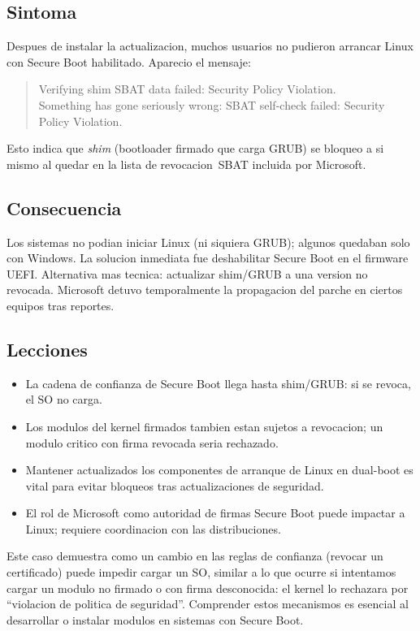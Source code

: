 \subsection*{Sintoma}

Despues de instalar la actualizacion, muchos usuarios no pudieron arrancar Linux con Secure Boot habilitado. Aparecio el mensaje:

\begin{quote}\small
Verifying shim SBAT data failed: Security Policy Violation.\\
Something has gone seriously wrong: SBAT self-check failed: Security Policy Violation.
\end{quote}

Esto indica que \emph{shim} (bootloader firmado que carga GRUB) se bloqueo a si mismo al quedar en la lista de revocacion~SBAT incluida por Microsoft.

\subsection*{Consecuencia}

Los sistemas no podian iniciar Linux (ni siquiera GRUB); algunos quedaban solo con Windows. La solucion inmediata fue deshabilitar Secure Boot en el firmware UEFI. Alternativa mas tecnica: actualizar shim/GRUB a una version no revocada. Microsoft detuvo temporalmente la propagacion del parche en ciertos equipos tras reportes.

\subsection*{Lecciones}

\begin{itemize}
  \item La cadena de confianza de Secure Boot llega hasta shim/GRUB: si se revoca, el SO no carga.
  \item Los modulos del kernel firmados tambien estan sujetos a revocacion; un modulo critico con firma revocada seria rechazado.
  \item Mantener actualizados los componentes de arranque de Linux en dual-boot es vital para evitar bloqueos tras actualizaciones de seguridad.
  \item El rol de Microsoft como autoridad de firmas Secure Boot puede impactar a Linux; requiere coordinacion con las distribuciones.
\end{itemize}

Este caso demuestra como un cambio en las reglas de confianza (revocar un certificado) puede impedir cargar un SO, similar a lo que ocurre si intentamos cargar un modulo no firmado o con firma desconocida: el kernel lo rechazara por ``violacion de politica de seguridad''. Comprender estos mecanismos es esencial al desarrollar o instalar modulos en sistemas con Secure Boot.
